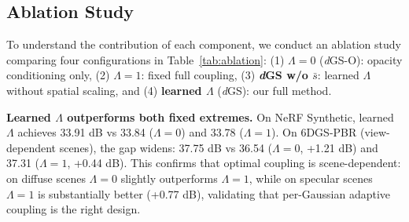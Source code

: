 \documentclass{article}
\theoremstyle{plain}
\theoremstyle{definition}
\theoremstyle{remark}
\begin{document}
\begin{table}[!t]
\centering
\caption{Ablation study on NeRF Synthetic and 6DGS-PBR datasets. $\Lambda{=}0$ corresponds to \textit{d}GS-O (opacity only), $\Lambda{=}1$ fixes full coupling, and learned $\Lambda$ is the full \textit{d}GS. ``w/o $\bar{s}$'' removes spatial scaling from displacement.}
\label{tab:ablation}
\setlength{\tabcolsep}{4pt}
%
\vspace{-1em}
\end{table}

\subsection{Ablation Study}

To understand the contribution of each component, we conduct an ablation study comparing four configurations in Table~\ref{tab:ablation}: (1) \textbf{$\Lambda{=}0$} (\textit{d}GS-O): opacity conditioning only, (2) \textbf{$\Lambda{=}1$}: fixed full coupling, (3) \textbf{\textit{d}GS w/o $\bar{s}$}: learned $\Lambda$ without spatial scaling, and (4) \textbf{learned $\Lambda$} (\textit{d}GS): our full method.

\textbf{Learned $\Lambda$ outperforms both fixed extremes.} On NeRF Synthetic, learned $\Lambda$ achieves 33.91 dB vs 33.84 ($\Lambda{=}0$) and 33.78 ($\Lambda{=}1$). On 6DGS-PBR (view-dependent scenes), the gap widens: 37.75 dB vs 36.54 ($\Lambda{=}0$, +1.21 dB) and 37.31 ($\Lambda{=}1$, +0.44 dB). This confirms that optimal coupling is scene-dependent: on diffuse scenes $\Lambda{=}0$ slightly outperforms $\Lambda{=}1$, while on specular scenes $\Lambda{=}1$ is substantially better (+0.77 dB), validating that per-Gaussian adaptive coupling is the right design.
\end{document}
